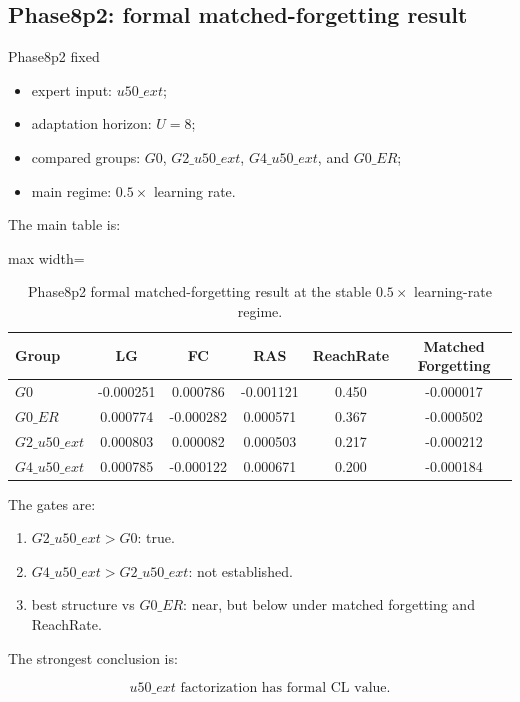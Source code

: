 \documentclass[11pt]{article}
\newcommand{\tablesize}{\footnotesize}
\begin{document}
\subsection{Phase8p2: formal matched-forgetting result}

Phase8p2 fixed

\begin{itemize}[leftmargin=1.5em]
    \item expert input: $u50\_ext$;
    \item adaptation horizon: $U=8$;
    \item compared groups: $G0$, $G2\_u50\_ext$, $G4\_u50\_ext$, and $G0\_ER$;
    \item main regime: $0.5\times$ learning rate.
\end{itemize}

The main table is:

\begin{table}[H]
\centering
\tablesize
\begin{adjustbox}{max width=\linewidth}
\begin{tabular}{lccccc}
\toprule
Group & LG & FC & RAS & ReachRate & Matched Forgetting \\
\midrule
$G0$ & -0.000251 & 0.000786 & -0.001121 & 0.450 & -0.000017 \\
$G0\_ER$ & 0.000774 & -0.000282 & 0.000571 & 0.367 & -0.000502 \\
$G2\_u50\_ext$ & 0.000803 & 0.000082 & 0.000503 & 0.217 & -0.000212 \\
$G4\_u50\_ext$ & 0.000785 & -0.000122 & 0.000671 & 0.200 & -0.000184 \\
\bottomrule
\end{tabular}
\end{adjustbox}
\caption{Phase8p2 formal matched-forgetting result at the stable $0.5\times$ learning-rate regime.}
\end{table}

The gates are:

\begin{enumerate}[leftmargin=1.5em]
    \item $G2\_u50\_ext > G0$: true.
    \item $G4\_u50\_ext > G2\_u50\_ext$: not established.
    \item best structure vs $G0\_ER$: near, but below under matched forgetting and ReachRate.
\end{enumerate}

The strongest conclusion is:

$$
u50\_ext \text{ factorization has formal CL value.}
$$
\end{document}
